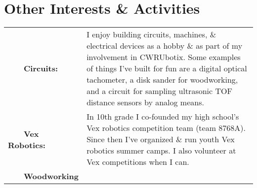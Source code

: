 \documentclass[a4paper,10pt]{article}
\newcommand{\tabitem}{~~\llap{\textbullet}~~}
\begin{document}
\section{Other Interests \& Activities}\vspace{-1mm}

\begin{tabular}{l p{13cm}} %
\tabitem \textbf{Circuits:} 		&  I enjoy building circuits, machines, \& electrical devices as a hobby \& as part of my involvement in CWRUbotix. Some examples of things I've built for fun are a digital optical tachometer, a disk sander for woodworking, and a circuit for sampling ultrasonic TOF distance sensors by analog means.\\
\tabitem \textbf{Vex Robotics:} 	&  In 10th grade I co-founded my high school's Vex robotics competition team (team 8768A). Since then I've organized \& run youth Vex robotics summer camps. I also volunteer at Vex competitions when I can.\\
\tabitem \textbf{Woodworking} & 
\end{tabular}
\end{document}

